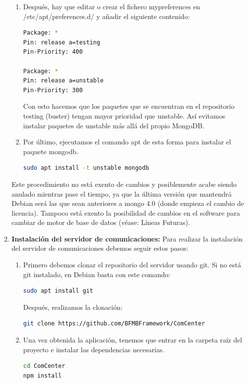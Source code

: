 \documentclass[spanish,12pt, a4paper, twoside]{paper}
\begin{document}
\begin{enumerate}
\begin{enumerate}
\item Después, hay que editar o crear el fichero mypreferences en /etc/apt/preferences.d/ y añadir el siguiente contenido:
\begin{lstlisting}[language=sh]
Package: *
Pin: release a=testing
Pin-Priority: 400

Package: *
Pin: release a=unstable
Pin-Priority: 300
\end{lstlisting}

Con esto hacemos que los paquetes que se encuentran en el repositorio testing (buster) tengan mayor prioridad que unstable. Así evitamos instalar paquetes de unstable más allá del propio MongoDB.

\item Por último, ejecutamos el comando apt de esta forma para instalar el paquete mongodb.
\begin{lstlisting}[language=sh]
sudo apt install -t unstable mongodb
\end{lstlisting}
\end{enumerate}

Este procedimiento no está exento de cambios y posiblemente acabe siendo anulado mientras pase el tiempo, ya que la última versión que mantendrá Debian será las que sean anteriores a mongo 4.0 (donde empieza el cambio de licencia). Tampoco está exento la posibilidad de cambios en el software para cambiar de motor de base de datos (véase: Líneas Futuras).

\item\textbf{Instalación del servidor de comunicaciones:} Para realizar la instalación del servidor de comunicaciones debemos seguir estos pasos:

\begin{enumerate}
\item Primero debemos clonar el repositorio del servidor usando git. Si no está git instalado, en Debian basta con este comando:
\begin{lstlisting}[language=sh]
sudo apt install git
\end{lstlisting}

Después, realizamos la clonación:
\begin{lstlisting}[language=sh]
git clone https://github.com/BFMBFramework/ComCenter
\end{lstlisting}

\item Una vez obtenida la aplicación, tenemos que entrar en la carpeta raíz del proyecto e instalar las dependencias necesarias.
\begin{lstlisting}[language=sh]
cd ComCenter
npm install
\end{lstlisting}


\end{enumerate}
\end{enumerate}
\end{document}

